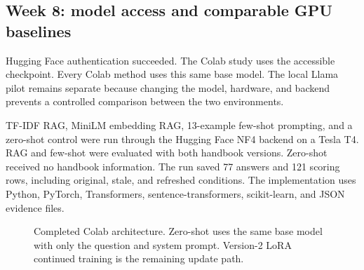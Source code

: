 \documentclass[10pt,letterpaper]{article}
\begin{document}
\subsection{Week 8: model access and comparable GPU baselines}
Hugging Face authentication succeeded. The Colab study uses the accessible  checkpoint. Every Colab method uses this same base model. The local Llama pilot remains separate because changing the model, hardware, and backend prevents a controlled comparison between the two environments.

TF-IDF RAG, MiniLM embedding RAG, 13-example few-shot prompting, and a zero-shot control were run through the Hugging Face NF4 backend on a Tesla T4. RAG and few-shot were evaluated with both handbook versions. Zero-shot received no handbook information. The run saved 77 answers and 121 scoring rows, including original, stale, and refreshed conditions. The implementation uses Python, PyTorch, Transformers, sentence-transformers, scikit-learn, and JSON evidence files.

\begin{figure}[htbp]\centering
{}
\caption{Completed Colab architecture. Zero-shot uses the same base model with only the question and system prompt. Version-2 LoRA continued training is the remaining update path.}
\label{fig:architecture}
\end{figure}
\end{document}
